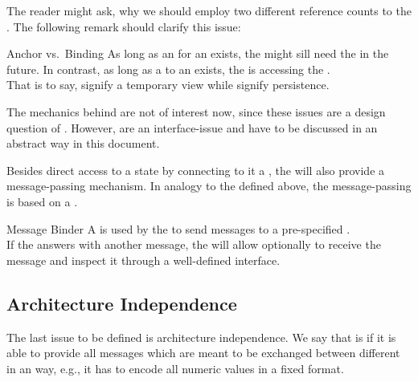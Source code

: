 \documentclass[a4paper, 12pt]{book}
\begin{document}
The reader might ask, why we should employ two different reference counts to
the . The following remark should clarify this
issue:
\begin{remark*}{Anchor vs.~Binding}
  As long as an  for an  exists, the
   might sill need the  in the future. In
  contrast, as long as a  to an  exists,
  the  is accessing the .\\
  That is to say,  signify a temporary view while 
  signify persistence.
\end{remark*}
%
The mechanics behind  are not of interest now, since these issues
are a design question of \SYNEIGHT. However,  are an
interface-issue and have to be discussed in an abstract way in this document. 



Besides direct access to a state by connecting to it a , the
\SYNEIGHT will also provide a message-passing mechanism.
%
In analogy to the  defined above, the message-passing is based on a
.

\begin{definition*}{Message Binder}
  \label{def:message-binder}
  A  is used by the  to send messages to a
  pre-specified .\\
  If the  answers with another message,
  the  will allow optionally to receive the message and
  inspect it through a well-defined interface.
\end{definition*}






\subsection{Architecture Independence}

The last issue to be defined is architecture independence. We say that
 is  if it is able
to provide all messages which are meant to be exchanged between different
 in an  way, e.g., it
has to encode all numeric values in a fixed format. 
\end{document}

